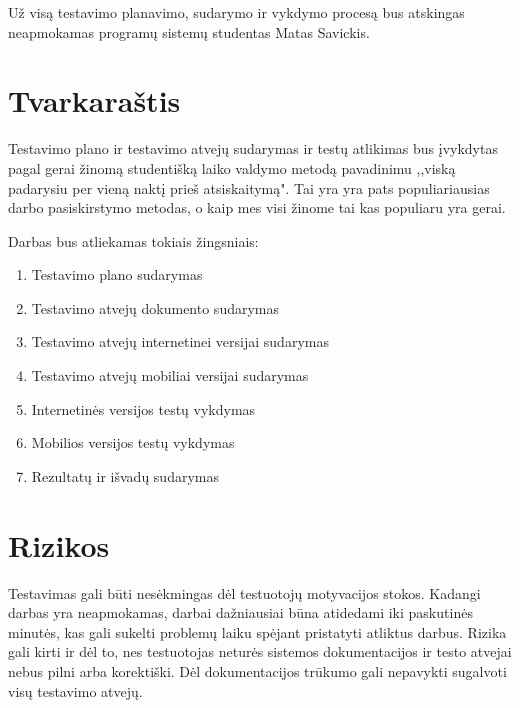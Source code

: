 \documentclass[oneside]{VUMIFPSkursinis}
\begin{document}
Už visą testavimo planavimo, sudarymo ir vykdymo procesą bus atskingas neapmokamas programų sistemų studentas Matas Savickis.  

\section{Tvarkaraštis}
Testavimo plano ir testavimo atvejų sudarymas ir testų atlikimas bus įvykdytas pagal gerai žinomą studentišką laiko valdymo metodą pavadinimu ,,viską padarysiu per vieną naktį prieš atsiskaitymą". Tai yra yra pats populiariausias darbo pasiskirstymo metodas, o kaip mes visi žinome tai kas populiaru yra gerai.\newline



Darbas bus atliekamas tokiais žingsniais:

\begin{enumerate}
	\item{Testavimo plano sudarymas}
	\item{Testavimo atvejų dokumento sudarymas}
	\item{Testavimo atvejų internetinei versijai sudarymas}
	\item{Testavimo atvejų mobiliai versijai sudarymas}
	\item{Internetinės versijos testų vykdymas}
	\item{Mobilios versijos testų vykdymas}
	\item{Rezultatų ir išvadų sudarymas}
\end{enumerate}

\section{Rizikos}
Testavimas gali būti nesėkmingas dėl testuotojų motyvacijos stokos. Kadangi darbas yra neapmokamas, darbai dažniausiai būna atidedami iki paskutinės minutės, kas gali sukelti problemų laiku spėjant pristatyti atliktus darbus. Rizika gali kirti ir dėl to, nes  testuotojas neturės sistemos dokumentacijos ir testo atvejai nebus pilni arba korektiški. Dėl dokumentacijos trūkumo gali nepavykti sugalvoti visų testavimo atvejų.

\end{document}
